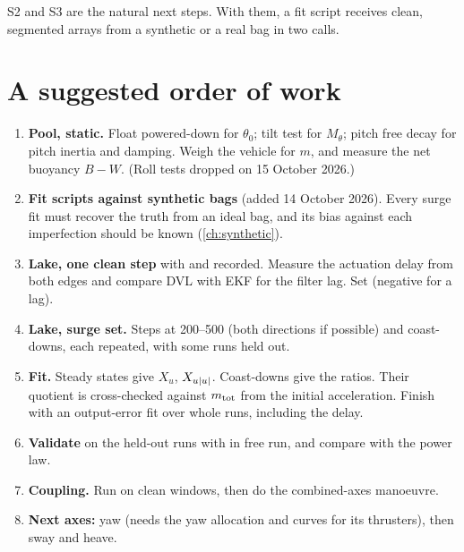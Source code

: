 S2 and S3 are the natural next steps. With them, a fit script receives clean, segmented
arrays from a synthetic or a real bag in two calls.

\section{A suggested order of work}

\begin{enumerate}
  \item \textbf{Pool, static.} Float powered-down for $\theta_0$; tilt test for $M_\theta$; pitch
        free decay for pitch inertia and damping. Weigh the vehicle for $m$, and measure the net
        buoyancy $B - W$. (Roll tests dropped on 15 October 2026.)
  \item \textbf{Fit scripts against synthetic bags} (added 14 October 2026). Every surge fit must
        recover the truth from an ideal bag, and its bias against each imperfection should be known
        (\cref{ch:synthetic}).
  \item \textbf{Lake, one clean step} with  and  recorded.
        Measure the actuation delay from both edges and compare DVL with EKF for the filter lag.
        Set  (negative for a lag).
  \item \textbf{Lake, surge set.} Steps at 200--500 (both directions if possible) and coast-downs,
        each repeated, with some runs held out.
  \item \textbf{Fit.} Steady states give $X_u$, $X_{u|u|}$. Coast-downs give the ratios. Their
        quotient is cross-checked against $m_\mathrm{tot}$ from the initial acceleration. Finish with an
        output-error fit over whole runs, including the delay.
  \item \textbf{Validate} on the held-out runs with  in free run, and
        compare with the power law.
  \item \textbf{Coupling.} Run  on clean windows, then do the combined-axes manoeuvre.
  \item \textbf{Next axes:} yaw (needs the yaw allocation and curves for its thrusters), then sway and heave.
\end{enumerate}
